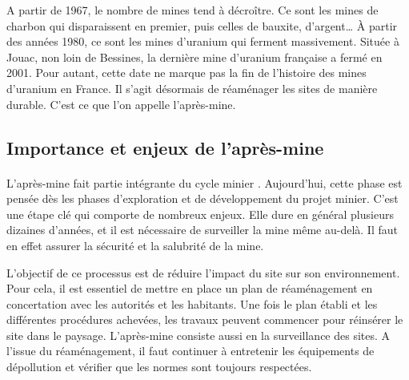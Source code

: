 \documentclass{article}
\begin{document}



A partir de 1967, le nombre de mines tend à décroître. Ce sont les mines de charbon qui disparaissent en premier, puis celles de bauxite, d’argent… À partir des années 1980, ce sont les mines d’uranium qui ferment massivement. Située à Jouac, non loin de Bessines, la dernière mine d’uranium française a fermé en 2001. Pour autant, cette date ne marque pas la fin de l’histoire des mines d’uranium en France. Il s’agit désormais de réaménager les sites de manière durable. C’est ce que l’on appelle l’après-mine.




\subsection{Importance et enjeux de l'après-mine}
\paragraph{} L’après-mine fait partie intégrante du cycle minier \cite{himeur_apres-mine_2020}. Aujourd’hui, cette phase est pensée dès les phases d’exploration et de développement du projet minier. C’est une étape clé qui comporte de nombreux enjeux. Elle dure en général plusieurs dizaines d’années, et il est nécessaire de surveiller la mine même au-delà. Il faut en effet assurer la sécurité et la salubrité de la mine.

L’objectif de ce processus est de réduire l’impact du site sur son environnement. Pour cela, il est essentiel de mettre en place un plan de réaménagement en concertation avec les autorités et les habitants. Une fois le plan établi et les différentes procédures achevées, les travaux peuvent commencer pour réinsérer le site dans le paysage. L’après-mine consiste aussi en la surveillance des sites. A l’issue du réaménagement, il faut continuer à entretenir les équipements de dépollution et vérifier que les normes sont toujours respectées.
\end{document}
